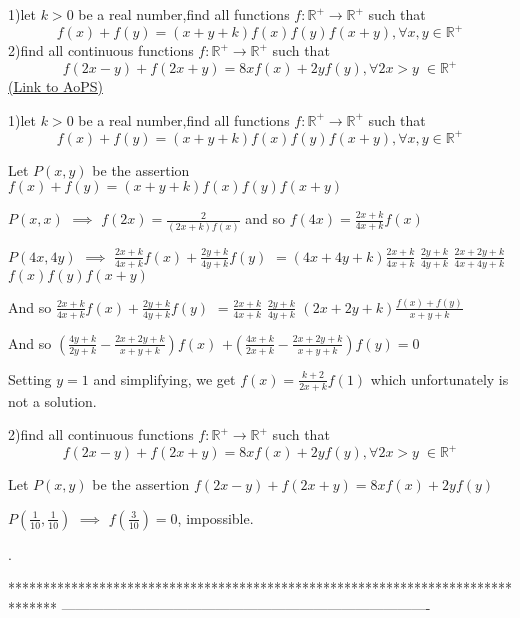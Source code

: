 \begin{problem}
	1)let $k>0$ be a real number,find all functions $f:\mathbb{R^+}\to\mathbb{R^+}$ such that 
\[f(x)+f(y)=(x+y+k)f(x)f(y)f(x+y),\forall x,y\in\mathbb{R^+}\]
2)find all continuous functions $f:\mathbb{R^+}\to\mathbb{R^+}$ such that 
\[f(2x-y)+f(2x+y)=8xf(x)+2yf(y),\forall 2x>y \;\in\mathbb{R^+}\]
	\flushright \href{https://artofproblemsolving.com/community/c6h561900}{(Link to AoPS)}
\end{problem}



\begin{solution}
	\begin{tcolorbox}1)let $k>0$ be a real number,find all functions $f:\mathbb{R^+}\to\mathbb{R^+}$ such that 
\[f(x)+f(y)=(x+y+k)f(x)f(y)f(x+y),\forall x,y\in\mathbb{R^+}\]\end{tcolorbox}
Let $P(x,y)$ be the assertion $f(x)+f(y)=(x+y+k)f(x)f(y)f(x+y)$

$P(x,x)$ $\implies$ $f(2x)=\frac{2}{(2x+k)f(x)}$ and so $f(4x)=\frac{2x+k}{4x+k}f(x)$

$P(4x,4y)$ $\implies$ $\frac{2x+k}{4x+k}f(x)+\frac{2y+k}{4y+k}f(y)$ $=(4x+4y+k)\frac{2x+k}{4x+k}$ $\frac{2y+k}{4y+k}$ $\frac{2x+2y+k}{4x+4y+k}$ $f(x)f(y)f(x+y)$

And so $\frac{2x+k}{4x+k}f(x)+\frac{2y+k}{4y+k}f(y)$ $=\frac{2x+k}{4x+k}$ $\frac{2y+k}{4y+k}$ $(2x+2y+k)\frac{f(x)+f(y)}{x+y+k}$

And so $\left(\frac{4y+k}{2y+k}-\frac{2x+2y+k}{x+y+k}\right)f(x)$ $+\left(\frac{4x+k}{2x+k}-\frac{2x+2y+k}{x+y+k}\right)f(y)=0$ 

Setting $y=1$ and simplifying, we get $f(x)=\frac{k+2}{2x+k}f(1)$ which unfortunately is not a solution.

\end{solution}



\begin{solution}
	\begin{tcolorbox}2)find all continuous functions $f:\mathbb{R^+}\to\mathbb{R^+}$ such that 
\[f(2x-y)+f(2x+y)=8xf(x)+2yf(y),\forall 2x>y \;\in\mathbb{R^+}\]\end{tcolorbox}
Let $P(x,y)$ be the assertion $f(2x-y)+f(2x+y)=8xf(x)+2yf(y)$

$P(\frac 1{10},\frac 1{10})$ $\implies$ $f(\frac 3{10})=0$, impossible.

.
\end{solution}
*******************************************************************************
-------------------------------------------------------------------------------

